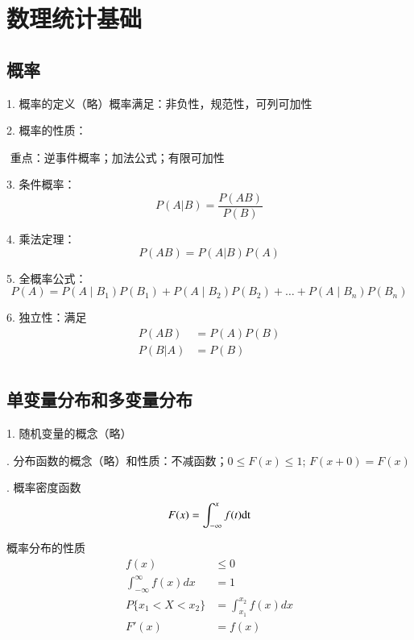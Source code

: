 \chapter{数理统计基础}
\section{概率}

1. 概率的定义（略）概率满足：非负性，规范性，可列可加性

2. 概率的性质：

   ​	重点：逆事件概率；加法公式；有限可加性

3. 条件概率：
\begin{equation}
    P(A|B)=\frac{P(AB)}{P(B)}
\end{equation}

4. 乘法定理：
\begin{equation}
    P(AB)=P(A|B)P(A)
\end{equation}

5. 全概率公式：
\begin{equation}
    P(A)=P\left(A \mid B_{1}\right) P\left(B_{1}\right)+
    P\left(A \mid B_{2}\right) P\left(B_{2}\right)+\ldots+
    P\left(A \mid B_{n}\right) P\left(B_{n}\right)
\end{equation}

6. 独立性：满足
\begin{subequations}
    \begin{align}
        P(AB)&=P(A)P(B) \\ 
        P(B|A)&=P(B)\\
    \end{align}
\end{subequations}

\section{单变量分布和多变量分布}
\setlength{\parindent}{2em}1. 随机变量的概念（略）

. 分布函数的概念（略）和性质：不减函数；$0\leq F(x)\leq 1 $; $F(x+0)=F(x)$
 
. 概率密度函数
 \begin{equation}
    F(x)=\int_{-\infty}^{x}f(t) \rm dt
\end{equation}
 
\begin{prop}{概率分布的性质}
    \begin{subequations}
    \begin{align}
        f(x)&\leq 0 \\ 
        \int_{-\infty}^{\infty}f(x)dx&=1\\
        P\{x_1<X<x_2\}&=\int_{x_1}^{x_2}f(x)dx\\
        F'(x)&=f(x)
    \end{align}
    \end{subequations}
\end{prop}


